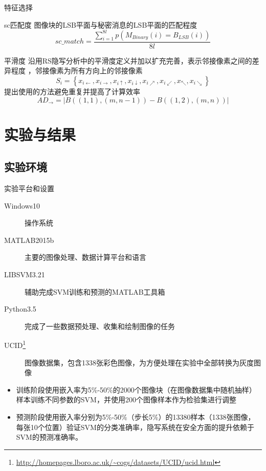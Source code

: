 \documentclass[14pt]{Bredelebeamer}
\begin{document}
\begin{frame}{特征选择}
  \pause
	\begin{block}{sc匹配度}
	图像块的LSB平面与秘密消息的LSB平面的匹配程度
	$$sc\_match = \frac{{\sum\limits_{i = 1}^{8l} {p\left( {{M_{Binary}}\left( i \right) = {B_{LSB}}\left( i \right)} \right)} }}{{8l}}$$
	\end{block}

\pause
	\begin{exampleblock}{平滑度}
		沿用RS隐写分析中的平滑度定义并加以扩充完善，表示邻接像素之间的差异程度
	，邻接像素为所有方向上的邻接像素
$${S_i} = \left\{ {{x_{i \leftarrow }},{x_{i \to }},{x_{i \uparrow }},{x_{i \downarrow }},{x_{i \nearrow }},{x_{i \swarrow }},{x_ \nwarrow },{x_{i \searrow }}} \right\}$$
	提出使用的方法避免重复并提高了计算效率
	$$A{D_ \to } = \left| {B\left( {\left( {1,1} \right),\left( {m,n - 1} \right)} \right) - B\left( {\left( {1,2} \right),\left( {m,n} \right)} \right)} \right|$$
	\end{exampleblock}
\end{frame}




\section{实验与结果}
\subsection{实验环境}
\begin{frame}{实验平台和设置}
	\begin{description}
		\item[Windows10] 操作系统
		\item[MATLAB2015b] 主要的图像处理、数据计算平台和语言
    \item[LIBSVM3.21] 辅助完成SVM训练和预测的MATLAB工具箱
		\item[Python3.5] 完成了一些数据预处理、收集和绘制图像的任务
		\item[UCID\footnote{\url{http://homepages.lboro.ac.uk/~cogs/datasets/UCID/ucid.html}}] 图像数据集，包含1338张彩色图像，为方便处理在实验中全部转换为灰度图像
	\end{description}
  \pause
	\begin{block}{}
		\begin{itemize}
			\item 训练阶段使用嵌入率为5\%-50\%的2000个图像块（在图像数据集中随机抽样）样本训练不同参数的SVM，并使用200个图像样本作为检验集进行调整
			\item 预测阶段使用嵌入率分别为5\%-50\%（步长5\%）的13380样本（1338张图像，每张10个位置）验证SVM的分类准确率，隐写系统在安全方面的提升依赖于SVM的预测准确率。
		\end{itemize}
	\end{block}
\end{frame}
\end{document}
